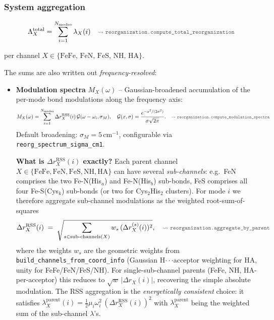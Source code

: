 \documentclass[11pt,a4paper,twoside]{article}
\newcommand{\codref}[1]{%
  \quad\text{\textcolor{gray!70!black}{\footnotesize $\rightsquigarrow$~\texttt{#1}}}}
\theoremstyle{remark}
\begin{document}
\subsubsection*{System aggregation}

\begin{equation}
  \Lambda_X^\text{total} = \sum_{i=1}^{N_\text{modes}} \lambda_X(i)
  \codref{reorganization.compute\_total\_reorganization}
  \label{eq:lambda-total}
\end{equation}

per channel $X \in \{\text{FeFe, FeN, FeS, NH, HA}\}$.

The sums are also written out \emph{frequency-resolved}:

\begin{itemize}
  \item \textbf{Modulation spectra} $M_X(\omega)$ -- Gaussian-broadened
        accumulation of the per-mode bond modulations along the
        frequency axis:
        \begin{equation}
          M_X(\omega)
          = \sum_{i=1}^{N_\text{modes}}
            \Delta r_X^\text{RSS}(i)\,
            \mathcal{G}(\omega - \omega_i, \sigma_M),
          \quad
          \mathcal{G}(x,\sigma) = \frac{e^{-x^2/(2\sigma^2)}}{\sigma\sqrt{2\pi}}.
          \codref{reorganization.compute\_modulation\_spectra}
          \label{eq:M-spectrum}
        \end{equation}
        Default broadening: $\sigma_M = 5$\,cm$^{-1}$, configurable
        via \texttt{reorg\_spectrum\_sigma\_cm1}.

        \medskip
        \noindent\textbf{What is $\Delta r_X^\text{RSS}(i)$ exactly?}
        Each parent channel
        $X \in \{\text{FeFe}, \text{FeN}, \text{FeS}, \text{NH}, \text{HA}\}$
        can have several \emph{sub-channels}: e.g.\ FeN comprises the
        two Fe-N(His$_a$) and Fe-N(His$_b$) sub-bonds, FeS comprises
        all four Fe-S(Cys$_k$) sub-bonds (or two for Cys$_2$His$_2$
        clusters). For mode $i$ we therefore aggregate sub-channel
        modulations as the weighted root-sum-of-squares
        \begin{equation}
          \Delta r_X^\text{RSS}(i)
            \;=\; \sqrt{\sum_{s \in \text{sub-channels}(X)}
                          w_s\,(\Delta r_X^{(s)}(i))^2},
          \codref{reorganization.aggregate\_by\_parent}
          \label{eq:dr-rss}
        \end{equation}
        where the weights $w_s$ are the geometric weights from
        \texttt{build\_channels\_from\_coord\_info} (Gaussian
        H$\cdot\cdot\cdot$acceptor weighting for HA, unity for
        FeFe/FeN/FeS/NH).  For single-sub-channel parents (FeFe, NH,
        HA-per-acceptor) this reduces to
        $\sqrt{w}\,|\Delta r_X(i)|$, recovering the simple absolute
        modulation. The RSS aggregation is the \emph{energetically
        consistent} choice: it satisfies
        $\lambda_X^\text{parent}(i) = \tfrac{1}{2}\mu_i\omega_i^2
        \,(\Delta r_X^\text{RSS}(i))^2$ with $\lambda_X^\text{parent}$
        being the weighted sum of the sub-channel $\lambda$'s.


\end{itemize}
\end{document}
